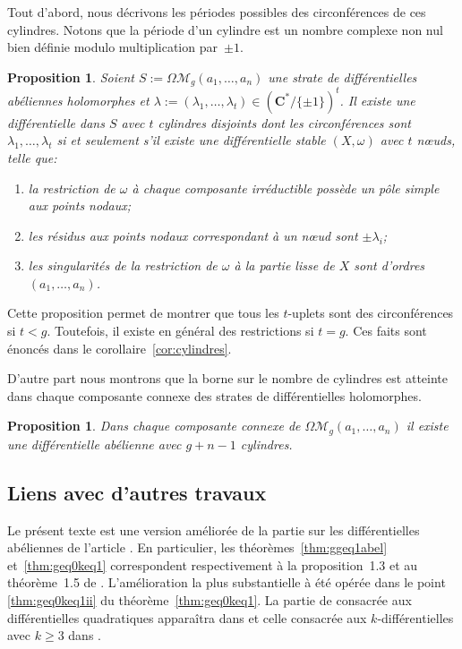\documentclass[JEP,XML,SOM,Unicode,francais,NoFloatCountersInSection,published]{cedram}
\let\mathcal\mathscr
\newcommand{\CC}{\mathbf{C}}
\newcommand{\omoduli}[1][g]{{\Omega\mathcal M}_{\!#1}}
\newtheorem{prop}[thm]{Proposition}
\theoremstyle{definition}
\begin{document}
Tout d'abord, nous décrivons les périodes possibles des circonférences de ces cylindres. Notons que la période d'un cylindre est un nombre complexe non nul bien définie modulo multiplication par~$\pm 1$.
\begin{prop}\label{prop:cylindres}
Soient $S:=\omoduli(a_{1},\dots,a_{n})$ une strate de différentielles abéliennes holomorphes et $\lambda:=(\lambda_{1},\dots,\lambda_{t})\in (\CC^{\ast}/\{\pm1\})^{t}$.
Il existe une différentielle dans $S$ avec $t$ cylindres disjoints dont les circonférences sont $\lambda_{1},\dots,\lambda_{t}$ si et seulement s'il existe une
différentielle stable $(X,\omega)$ avec $t$ nœuds, telle que:
\begin{enumerate}
\item la restriction de $\omega$ à chaque composante irréductible possède un pôle simple aux points nodaux;
\item les résidus aux points nodaux correspondant à un nœud sont $\pm \lambda_{i}$;
\item les singularités de la restriction de $\omega$ à la partie lisse de $X$ sont d'ordres $(a_{1},\dots,a_{n})$.
\end{enumerate}
\end{prop}
Cette proposition permet de montrer que tous les $t$-uplets sont des circonférences si $t<g$. Toutefois, il existe en général des restrictions si $t=g$. Ces faits sont énoncés dans le corollaire~\ref{cor:cylindres}.

D'autre part nous montrons que la borne sur le nombre de cylindres est atteinte dans chaque composante connexe des strates de différentielles holomorphes.
\begin{prop}\label{prop:cylcc}
Dans chaque composante connexe de $\omoduli(a_{1},\dots,a_{n})$ il existe une différentielle abélienne avec $g+n-1$ cylindres.
\end{prop}

\subsection{Liens avec d'autres travaux}
\label{sec:travauxintro}

Le présent texte est une version améliorée de la partie sur les différentielles abéliennes de l'article \cite{geta}. En particulier, les théorèmes~\ref{thm:ggeq1abel} et~\ref{thm:geq0keq1} correspondent respectivement à la proposition~1.3 et au théorème~1.5 de \cite{geta}. L'amélioration la plus substantielle à été opérée dans le point \eqref{thm:geq0keq1ii} du théorème~\ref{thm:geq0keq1}. La partie de \cite{geta} consacrée aux différentielles quadratiques apparaîtra dans \cite{getaquad} et celle consacrée aux $k$-différentielles avec $k\geq 3$ dans \cite{getakdiff}.
\end{document}
